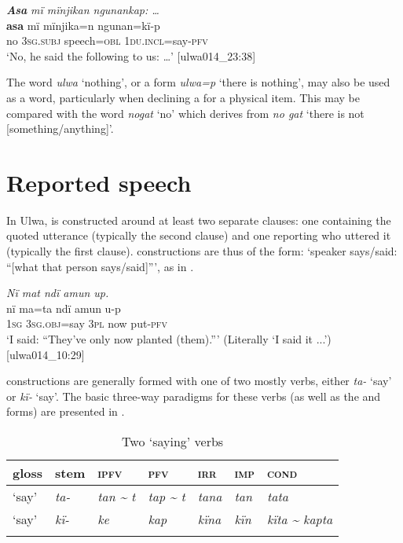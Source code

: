 \ea%
    \label{ex:syntax:179}
          \textbf{\textit{Asa}} \textit{mï mïnjikan ngunankap: …}\\
\gll    \textbf{asa}  mï      mïnjika=n    ngunan=kï-p\\
    no  3\textsc{sg.subj}  speech=\textsc{obl}  1\textsc{du.incl}=say-\textsc{pfv}\\
\glt `No, he said the following to us: …’ [ulwa014\_23:38]
\z

The word \textit{ulwa} ‘nothing’, or a  form \textit{ulwa=p} ‘there is nothing’, may also be used as a  word, particularly when declining a  for a physical item. This may be compared with the  word \textit{nogat} ‘no’ which derives from \textit{no gat} ‘there is not [something/anything]’.



\section{Reported speech}\label{sec:13.4}


In Ulwa,  is constructed around at least two separate clauses: one containing the quoted utterance (typically the second clause) and one reporting who uttered it (typically the first clause).  constructions are thus of the form: ‘speaker says/said: “[what that person says/said]”’, as in .

\ea%
    \label{ex:syntax:179a}
          \textit{Nï mat ndï amun up.}\\
\gll    nï ma=ta ndï amun u-p\\
   1\textsc{sg} 3\textsc{sg.obj}=say  3\textsc{pl} now put-\textsc{pfv}\\
\glt `I said: “They’ve only now planted (them).”’ (Literally ‘I said it ...’) [ulwa014\_10:29]
\z

 constructions are generally formed with one of two mostly  verbs, either \textit{ta-} ‘say’ or \textit{kï-} ‘say’. The basic three-way  paradigms for these verbs (as well as the  and  forms) are presented in .


\begin{table}
\caption{Two ‘saying’ verbs}
\label{tab:syntax:13}
\begin{tabularx}{\textwidth}{QQQQQQl}
\lsptoprule
gloss & stem & {\scshape ipfv} & {\scshape pfv} & {\scshape irr} & {\scshape imp} & {\scshape cond}\\
\midrule
‘say’ & {\itshape ta-} & {\itshape tan {\textasciitilde} t} & {\itshape tap \textup{{\textasciitilde}} t} & {\itshape tana} & {\itshape tan} & {\itshape tata}\\
‘say’ & {\itshape kï-} & {\itshape ke} & {\itshape kap} & {\itshape kïna} & {\itshape kïn} & {\itshape kïta {\textasciitilde} kapta}\\
\lspbottomrule
\end{tabularx}
\end{table}

